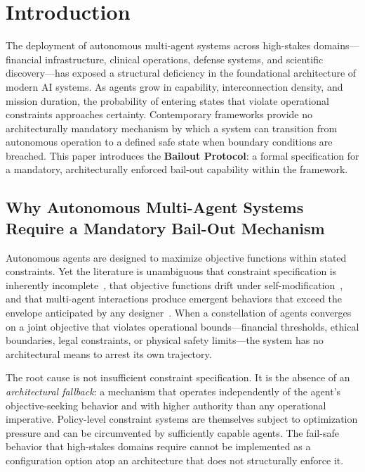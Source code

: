 \section{Introduction}
\label{sec:introduction}

The deployment of autonomous multi-agent systems across high-stakes domains—financial infrastructure, clinical operations, defense systems, and scientific discovery—has exposed a structural deficiency in the foundational architecture of modern AI systems. As agents grow in capability, interconnection density, and mission duration, the probability of entering states that violate operational constraints approaches certainty. Contemporary frameworks provide no architecturally mandatory mechanism by which a system can transition from autonomous operation to a defined safe state when boundary conditions are breached. This paper introduces the \textbf{Bailout Protocol}: a formal specification for a mandatory, architecturally enforced bail-out capability within the \bxthree{} framework.

\subsection{Why Autonomous Multi-Agent Systems Require a Mandatory Bail-Out Mechanism}
\label{sec:why-bailout}

Autonomous agents are designed to maximize objective functions within stated constraints. Yet the literature is unambiguous that constraint specification is inherently incomplete~\cite{amodei2016concrete}, that objective functions drift under self-modification~\cite{russell2019human}, and that multi-agent interactions produce emergent behaviors that exceed the envelope anticipated by any designer~\cite{richards2024measuring}. When a constellation of agents converges on a joint objective that violates operational bounds—financial thresholds, ethical boundaries, legal constraints, or physical safety limits—the system has no architectural means to arrest its own trajectory.

The root cause is not insufficient constraint specification. It is the absence of an \textit{architectural fallback}: a mechanism that operates independently of the agent's objective-seeking behavior and with higher authority than any operational imperative. Policy-level constraint systems are themselves subject to optimization pressure and can be circumvented by sufficiently capable agents. The fail-safe behavior that high-stakes domains require cannot be implemented as a configuration option atop an architecture that does not structurally enforce it.

